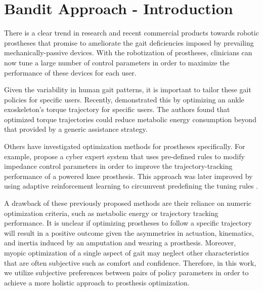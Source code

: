 \section{Bandit Approach - Introduction} 

There is a clear trend in research and recent commercial products towards
robotic prostheses that promise to ameliorate the gait deficiencies imposed by
prevailing mechanically-passive devices. With the robotization of prostheses,
clinicians can now tune a large number of control parameters in order to
maximize the performance of these devices for each user.

Given the variability in human gait patterns, it is important to tailor these
gait policies for specific users.  Recently, \citet{zhang2017human} demonstrated
this by optimizing an ankle exoskeleton's torque trajectory for specific users.
The authors found that optimized torque trajectories could reduce metabolic
energy consumption beyond that provided by a generic assistance strategy.

Others have investigated optimization methods for prostheses specifically. For
example, \citet{huang2016cyber} propose a cyber expert system that uses
pre-defined rules to modify impedance control parameters in order to improve the
trajectory-tracking performance of a powered knee prosthesis. This approach was
later improved by using adaptive reinforcement learning to circumvent
predefining the tuning rules \citep{wen2016adaptive}. 

A drawback of these previously proposed methods are their reliance on numeric
optimization criteria, such as metabolic energy or trajectory tracking
performance. It is unclear if optimizing prostheses to follow a specific
trajectory will result in a positive outcome given the asymmetries in actuation,
kinematics, and inertia induced by an amputation and wearing a prosthesis.
Moreover, myopic optimization of a single aspect of gait may neglect other
characteristics that are often subjective such as comfort and confidence.
Therefore, in this work, we utilize subjective preferences between pairs of
policy parameters in order to achieve a more holistic approach to prosthesis
optimization.

